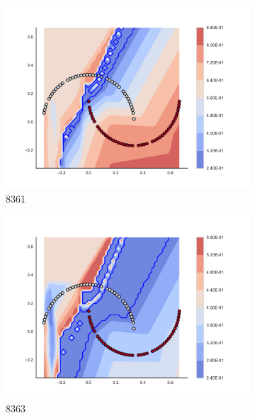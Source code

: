\begin{figure}[h]
\begin{subfigure}[b]{0.09\textwidth}
    \includegraphics[clip, trim=2.35cm 1.75cm 4.5cm 0cm,width=\textwidth]{img/convergence/8361.pdf}
    \caption{8361}
    \label{fig:convergence_8361}
\end{subfigure}
%
\begin{subfigure}[b]{0.09\textwidth}
    \includegraphics[clip, trim=2.35cm 1.75cm 4.5cm 0cm,width=\textwidth]{img/convergence/8363.pdf}
    \caption{8363}
    \label{fig:convergence_8363}
\end{subfigure}
%
\begin{subfigure}[b]{0.09\textwidth}

\end{subfigure}
\end{figure}
